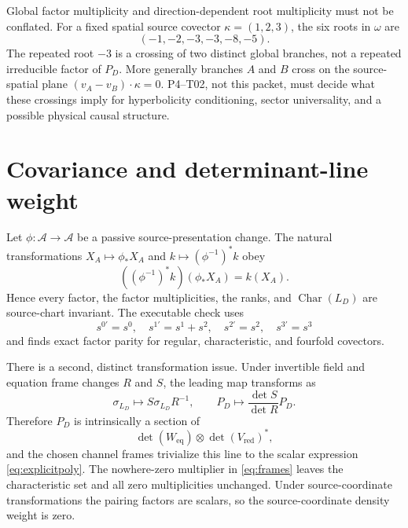 \documentclass[11pt]{article}
\newcommand{\A}{\mathcal A}
\newcommand{\Vred}{V_{\mathrm{red}}}
\newcommand{\Eeq}{W_{\mathrm{eq}}}
\newcommand{\sigmaL}{\sigma_{L_D}}
\newcommand{\Char}{\operatorname{Char}}
\begin{document}
Global factor multiplicity and direction-dependent root multiplicity must not
be conflated.  For a fixed spatial source covector
$\kappa=(1,2,3)$, the six roots in $\omega$ are
\begin{equation}
 (-1,-2,-3,-3,-8,-5).
 \label{eq:rootcrossing}
\end{equation}
The repeated root $-3$ is a crossing of two distinct global branches, not a
repeated irreducible factor of $P_D$.  More generally branches $A$ and $B$
cross on the source-spatial plane
$(v_A-v_B)\cdot\kappa=0$.  P4--T02, not this packet, must decide what these
crossings imply for hyperbolicity conditioning, sector universality, and a
possible physical causal structure.

\section{Covariance and determinant-line weight}

Let $\phi:\A\to\A$ be a passive source-presentation change.  The natural
transformations $X_A\mapsto\phi_*X_A$ and
$k\mapsto(\phi^{-1})^*k$ obey
\begin{equation}
 ((\phi^{-1})^*k)(\phi_*X_A)=k(X_A).
 \label{eq:naturality}
\end{equation}
Hence every factor, the factor multiplicities, the ranks, and
$\Char(L_D)$ are source-chart invariant.  The executable check uses
\begin{equation}
 s^{0\prime}=s^0,\quad s^{1\prime}=s^1+s^2,\quad
 s^{2\prime}=s^2,\quad s^{3\prime}=s^3
 \label{eq:chart}
\end{equation}
and finds exact factor parity for regular, characteristic, and fourfold
covectors.

There is a second, distinct transformation issue.  Under invertible field and
equation frame changes $R$ and $S$, the leading map transforms as
\begin{equation}
 \sigmaL\longmapsto S\sigmaL R^{-1},
 \qquad
 P_D\longmapsto\frac{\det S}{\det R}P_D.
 \label{eq:frames}
\end{equation}
Therefore $P_D$ is intrinsically a section of
\begin{equation}
 \det(\Eeq)\otimes\det(\Vred)^*,
 \label{eq:detline}
\end{equation}
and the chosen channel frames trivialize this line to the scalar expression
\eqref{eq:explicitpoly}.  The nowhere-zero multiplier in
\eqref{eq:frames} leaves the characteristic set and all zero multiplicities
unchanged.  Under source-coordinate transformations the pairing factors are
scalars, so the source-coordinate density weight is zero.
\end{document}
